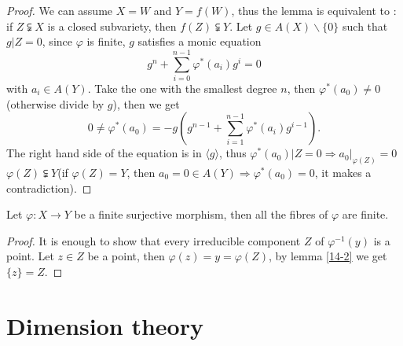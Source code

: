 \begin{proof}
	We can assume $ X=W $ and $ Y=f(W) $, thus the lemma is equivalent to : if $ Z\subsetneqq X $ is a closed subvariety, then $ f(Z)\subsetneqq Y $. Let $ g\in A(X)\backslash\lbrace 0 \rbrace $ such that $ g|Z=0 $, since $ \varphi $ is finite, $ g $ satisfies a monic equation
	$$
		g^n+\sum\limits_{i=0}^{n-1}\varphi^\ast (a_i)g^i=0
	$$
	with $ a_{i}\in A(Y) $. Take the one with the smallest degree $ n $, then $ \varphi^\ast (a_0)\neq 0 $(otherwise divide by $ g $), then we get
	$$
		0\neq \varphi^\ast(a_0)=-g(g^{n-1}+\sum\limits_{i=1}^{n-1}\varphi^\ast(a_i)g^{i-1}).
	$$
	The right hand side of the equation is in $ \langle g \rangle $, thus $ \varphi^\ast (a_0)|Z=0 \Rightarrow a_0|_{\varphi(Z)}=0$ $ \varphi(Z)\subsetneqq Y $(if $ \varphi(Z)=Y $, then $ a_0=0\in A(Y)\Rightarrow \varphi^\ast(a_0)=0 $, it makes a contradiction).
\end{proof}
\begin{corollary}
	Let $ \varphi:X\to Y $ be a finite surjective morphism, then all the fibres of $ \varphi $ are finite.
\end{corollary}
\begin{proof}
	It is enough to show that every irreducible component $ Z $ of $ \varphi^{-1}(y) $ is a point. Let $ z\in Z $ be a point, then $ \varphi(z)=y=\varphi(Z) $, by lemma \ref{14-2} we get $ \lbrace z \rbrace= Z $.
\end{proof}

\section{Dimension theory}


